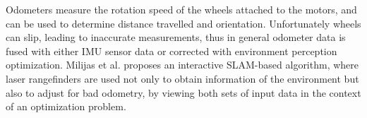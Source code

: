 Odometers measure the rotation speed of the wheels attached to the motors, and can be used to determine distance travelled and orientation. Unfortunately wheels can slip, leading to inaccurate measurements, thus in general odometer data is fused with either IMU sensor data or corrected with environment perception optimization. Milijas et al. \cite{9129529} proposes an interactive SLAM-based algorithm, where laser rangefinders are used not only to obtain information of the environment but also to adjust for bad odometry, by viewing both sets of input data in the context of an optimization problem.

\newpage



